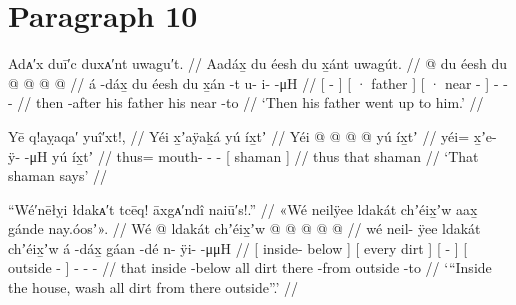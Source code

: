 \section{Paragraph 10}\label{sec:100-para-10}

\ex\label{ex:100-165-father-went-to-him}%
%
\begingl
	\glpreamble	Adᴀ′x duī′c duxᴀ′nt uwagu′t. //
	\glpreamble	Aadáx̱ du éesh du x̱ánt uwagút. //
	\gla	{}  @ {} {}
		{} du éesh {} 
		{} du  @ {} {}
		 @ {} @ {} @ {} //
	\glb	{} á -dáx̱ {} 
		{} du éesh {} 
		{} du x̱án -t {} 
		u- i-  -μH //
	\glc	{}[  - {}]
		{}[ · father {}]
		{}[ · near - {}]
		- -  - //
	\gld	{} then -after {}
		{} his father {}
		{} his near -to {}
		 {} {} {} {} {} //
	\glft	‘Then his father went up to him.’
		//
\endgl
\xe

\ex\label{ex:100-166-shaman-says}%
%
\begingl
	\glpreamble	Yē q!aỵaqa′ yuî′xt!, //
	\glpreamble	Yéi x̱ʼaÿaḵá yú íx̱tʼ //
	\gla	Yéi @  @ {} @ {} @ {}
		{} yú íx̱tʼ {} //
	\glb	yéi= x̱ʼe- ÿ-  -μH
		{} yú íx̱tʼ {} //
	\glc	thus= mouth- -  -
		{}[  shaman {}] //
	\gld	thus  {} {} {}
		{} that shaman {} //
	\glft	‘That shaman says’
		//
\endgl
\xe

\ex\label{ex:100-167-wash-house}%
%
\begingl
	\glpreamble	“Wé′nēłỵi łdakᴀ′t tcēq! āxgᴀ′ndî naiū′s!.” //
	\glpreamble	«\!Wé neilÿee ldakát chʼéix̱ʼw aax̱ gánde nay.óosʼ\!». //
	\gla	{} Wé  @ {} {} 
		{} ldakát chʼéix̱ʼw {} 
		{}  @ {} {} 
		{}  @ {} {}
		 @ {} @ {} @ {} //
	\glb	{} wé neil- ÿee {}
		{} ldakát chʼéix̱ʼw {} 
		{} á -dáx̱ {}
		{} gáan -dé {} 
		n- ÿi-  -μμH //
	\glc	{}[  inside- below {}]
		{}[ every dirt {}]
		{}[  - {}]
		{}[ outside - {}]
		- -  - //
	\gld	{} that inside -below {} 
		{} all dirt {}
		{} there -from {}
		{} outside -to {}
		 {} {} {} //
	\glft	‘“Inside the house, wash all dirt from there outside”.’
		//
\endgl
\xe

